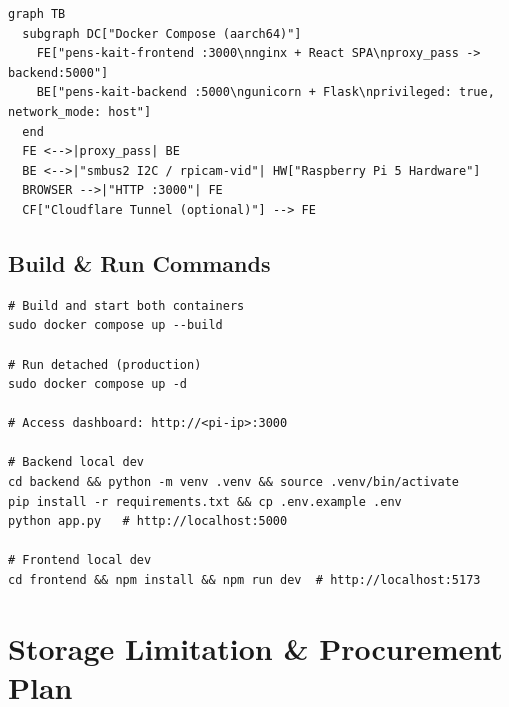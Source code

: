 \documentclass[12pt,a4paper]{article}
\begin{document}
\begin{tcolorbox}[colback=codebg, colframe=dark!30,
    title=Mermaid Source (docker\_deployment.mmd), fonttitle=\footnotesize\bfseries]
\begin{lstlisting}[style=mermaid]
graph TB
  subgraph DC["Docker Compose (aarch64)"]
    FE["pens-kait-frontend :3000\nnginx + React SPA\nproxy_pass -> backend:5000"]
    BE["pens-kait-backend :5000\ngunicorn + Flask\nprivileged: true, network_mode: host"]
  end
  FE <-->|proxy_pass| BE
  BE <-->|"smbus2 I2C / rpicam-vid"| HW["Raspberry Pi 5 Hardware"]
  BROWSER -->|"HTTP :3000"| FE
  CF["Cloudflare Tunnel (optional)"] --> FE
\end{lstlisting}
\end{tcolorbox}

\subsection{Build \& Run Commands}

\begin{tcolorbox}[colback=dark!95, colframe=dark,
    title=Docker Compose Commands, fonttitle=\small\bfseries\color{white},
    colupper=white]
\begin{lstlisting}[style=shell]
# Build and start both containers
sudo docker compose up --build

# Run detached (production)
sudo docker compose up -d

# Access dashboard: http://<pi-ip>:3000

# Backend local dev
cd backend && python -m venv .venv && source .venv/bin/activate
pip install -r requirements.txt && cp .env.example .env
python app.py   # http://localhost:5000

# Frontend local dev
cd frontend && npm install && npm run dev  # http://localhost:5173
\end{lstlisting}
\end{tcolorbox}

\section{Storage Limitation \& Procurement Plan}
\label{sec:storage}
\end{document}
